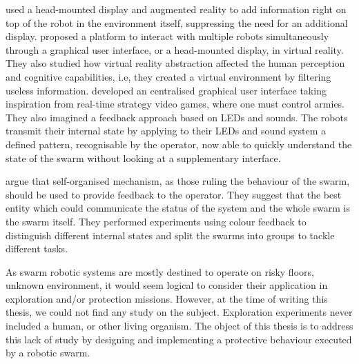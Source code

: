 \documentclass[oneside, a4paper, 12pt]{memoir}
\begin{document}
	\citet{daily2003world} used a head-mounted display and augmented reality to add information right on top of the robot in the environment itself, suppressing the need for an additional display. \citet{baizid2009human} proposed a platform to interact with multiple robots simultaneously through a graphical user interface, or a head-mounted display, in virtual reality. They also studied how virtual reality abstraction affected the human perception and cognitive capabilities, i.e, they created a virtual environment by filtering useless information. \citet{mclurkin2006speaking} developed an centralised graphical user interface taking inspiration from real-time strategy video games, where one must control armies. They also imagined a feedback approach based on LEDs and sounds. The robots transmit their internal state by applying to their LEDs and sound system a defined pattern, recognisable by the operator, now able to quickly understand the state of the swarm without looking at a supplementary interface.
	
	\citet{podevijn2012self} argue that self-organised mechanism, as those ruling the behaviour of the swarm, should be used to provide feedback to the operator. They suggest that the best entity which could communicate the status of the system and the whole swarm is the swarm itself. They performed experiments using colour feedback to distinguish different internal states and split the swarms into groups to tackle different tasks.
	

	
		
		
	
	As swarm robotic systems are mostly destined to operate on risky floors, unknown environment, it would seem logical to consider their application in exploration and/or protection missions. However, at the time of writing this thesis, we could not find any study on the subject. Exploration experiments never included a human, or other living organism. The object of this thesis is to address this lack of study by designing and implementing a protective behaviour executed by a robotic swarm.
	
\end{document}
